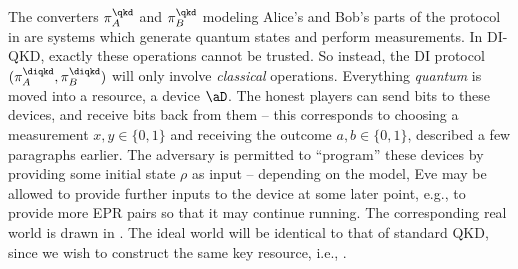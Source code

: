 The converters $\pi^\qkd_A$ and $\pi^\qkd_B$ modeling Alice's and
Bob's parts of the protocol in  are systems which
generate quantum states and perform measurements. In DI-QKD, exactly
these operations cannot be trusted. So instead, the DI protocol
$(\pi^\diqkd_A,\pi^\diqkd_B)$ will only involve \emph{classical}
operations. Everything \emph{quantum} is moved into a resource, a
device $\aD$. The honest players can send bits to these devices, and
receive bits back from them \--- this corresponds to choosing a
measurement $x,y \in \{0,1\}$ and receiving the outcome
$a,b \in \{0,1\}$, described a few paragraphs earlier. The adversary is
permitted to ``program'' these devices by providing some initial state
$\rho$ as input \--- depending on the model, Eve may be allowed to
provide further inputs to the device at some later point, e.g., to
provide more EPR pairs so that it may continue running. The
corresponding real world is drawn in
. The ideal world will be identical to
that of standard QKD, since we wish to construct the same key
resource, i.e., .


